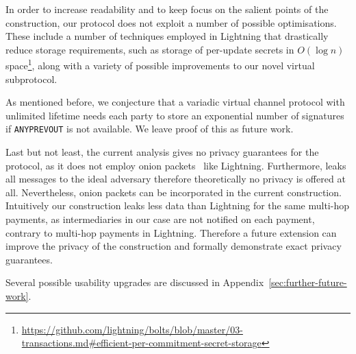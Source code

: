   In order to increase readability and to keep focus on the salient points of
  the construction, our protocol does not exploit a number of possible
  optimisations. These include a number of techniques employed in Lightning that
  drastically reduce storage requirements, such as storage of per-update secrets
  in $O(\log n)$
  space\footnote{\url{https://github.com/lightning/bolts/blob/master/03-transactions.md\#efficient-per-commitment-secret-storage}},
  along with a variety of possible improvements to our novel virtual
  subprotocol.

  As mentioned before, we conjecture that a variadic virtual
  channel protocol with unlimited lifetime needs each party to store an
  exponential number of signatures if \texttt{ANYPREVOUT} is not available. We
  leave proof of this as future work.

  Last but not least, the current analysis gives no privacy guarantees for the
  protocol, as it does not employ onion packets~\cite{sphinx} like Lightning.
  Furthermore, \fchan leaks all messages to the ideal adversary therefore
  theoretically no privacy is offered at all. Nevertheless, onion packets can be
  incorporated in the current construction. Intuitively our construction
  leaks less data than Lightning for the same multi-hop payments, as
  intermediaries in our case are not notified on each payment, contrary to
  multi-hop payments in Lightning. Therefore a future extension can improve the
  privacy of the construction and formally demonstrate exact privacy guarantees.

  Several possible usability upgrades are discussed in
  Appendix~\ref{sec:further-future-work}.
